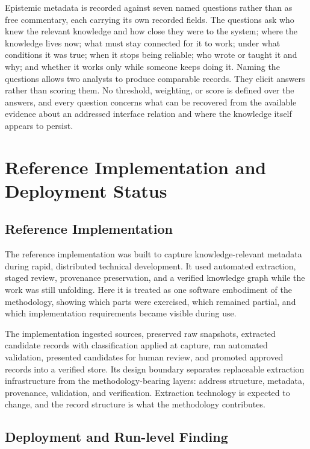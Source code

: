 \documentclass[preprints,article,submit,moreauthors]{Definitions/mdpi}
\begin{document}
Epistemic metadata is recorded against seven named questions rather than as free commentary, each carrying its own recorded fields. The questions ask who knew the relevant knowledge and how close they were to the system; where the knowledge lives now; what must stay connected for it to work; under what conditions it was true; when it stops being reliable; who wrote or taught it and why; and whether it works only while someone keeps doing it. Naming the questions allows two analysts to produce comparable records. They elicit answers rather than scoring them. No threshold, weighting, or score is defined over the answers, and every question concerns what can be recovered from the available evidence about an addressed interface relation and where the knowledge itself appears to persist.

\section{Reference Implementation and Deployment Status}\label{sec:7}

\subsection{Reference Implementation}\label{sec:7-1}

The reference implementation was built to capture knowledge-relevant metadata during rapid, distributed technical development. It used automated extraction, staged review, provenance preservation, and a verified knowledge graph while the work was still unfolding. Here it is treated as one software embodiment of the methodology, showing which parts were exercised, which remained partial, and which implementation requirements became visible during use.

The implementation ingested sources, preserved raw snapshots, extracted candidate records with classification applied at capture, ran automated validation, presented candidates for human review, and promoted approved records into a verified store. Its design boundary separates replaceable extraction infrastructure from the methodology-bearing layers: address structure, metadata, provenance, validation, and verification. Extraction technology is expected to change, and the record structure is what the methodology contributes.

\subsection{Deployment and Run-level Finding}\label{sec:7-2}
\end{document}

